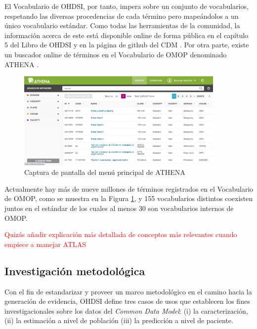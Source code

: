 El Vocabulario de OHDSI, por tanto, impera sobre un conjunto de vocabularios, respetando las diversas procedencias de cada término pero mapeándolos a un único vocabulario estándar.  Como todas las herramientas de la comunidad, la información acerca de este está disponible online de forma pública en el capítulo 5 del Libro de OHDSI \cite{OHDSIbook} y en la página de github del CDM \cite{gitPagesCMD}. Por otra parte, existe un buscador online de términos en el Vocabulario de OMOP denominado ATHENA \cite{ATHENAweb}. 

\begin{figure}[H]
\centering
\includegraphics[width=0.90\textwidth]{figures/ATHENAcap.png}
     \caption{Captura de pantalla del menú principal de ATHENA}
    \label{fig:ATHENAcap}
\end{figure}

Actualmente hay más de nueve millones de términos registrados en el Vocabulario de OMOP, como se muestra en la Figura \ref{fig:ATHENAcap}, y 155 vocabularios distintos coexisten juntos en el estándar de los cuales al menos 30 son vocabularios internos de OMOP.

\textcolor{red}{Quizás añadir explicación más detallada de conceptos más relevantes cuando empiece a manejar ATLAS}


\subsection{Investigación metodológica} \label{subsec:05investMetodolog}

Con el fin de estandarizar y proveer un marco metodológico en el camino hacia la generación de evidencia, OHDSI define tres casos de usos que establecen los fines investigacionales sobre los datos del \textit{Common Data Model}: (i) la caracterización, (ii) la estimación a nivel de población (iii) la predicción a nivel de paciente. 

